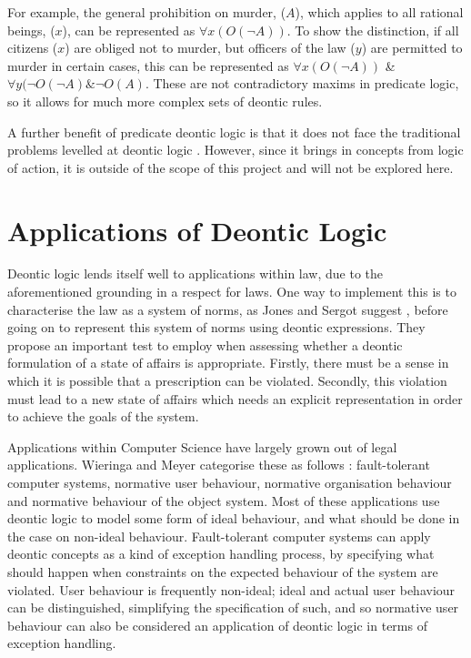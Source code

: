 \documentclass{l4proj}
\begin{document}
For example, the general prohibition on murder, ($A$), which applies to all rational beings, ($x$), can be represented as \( \forall{x(O( \neg A))} \). To show the distinction, if all citizens ($x$) are obliged not to murder, but officers of the law ($y$) are permitted to murder in certain cases, this can be represented as \( \forall{x(O( \neg A))} \) \& \( \forall{y( \neg O( \neg A) \& \neg O(A)} \). These are not contradictory maxims in predicate logic, so it allows for much more complex sets of deontic rules. 

A further benefit of predicate deontic logic is that it does not face the traditional problems levelled at deontic logic \cite{predicate}. However, since it brings in concepts from logic of action, it is outside of the scope of this project and will not be explored here. 

\section{Applications of Deontic Logic}
Deontic logic lends itself well to applications within law, due to the aforementioned grounding in a respect for laws. One way to implement this is to characterise the law as a system of norms, as Jones and Sergot suggest \cite{law-jonessergot}, before going on to represent this system of norms using deontic expressions. They propose an important test to employ when assessing whether a deontic formulation of a state of affairs is appropriate. Firstly, there must be a sense in which it is possible that a prescription can be violated. Secondly, this violation must lead to a new state of affairs which needs an explicit representation in order to achieve the goals of the system. 

Applications within Computer Science have largely grown out of legal applications. Wieringa and Meyer categorise these as follows \cite{meyer93applications}: fault-tolerant computer systems, normative user behaviour, normative organisation behaviour and normative behaviour of the object system. Most of these applications use deontic logic to model some form of ideal behaviour, and what should be done in the case on non-ideal behaviour. Fault-tolerant computer systems can apply deontic concepts as a kind of exception handling process, by specifying what should happen when constraints on the expected behaviour of the system are violated. User behaviour is frequently non-ideal; ideal and actual user behaviour can be distinguished, simplifying the specification of such, and so normative user behaviour can also be considered an application of deontic logic in terms of exception handling. 
\end{document}
